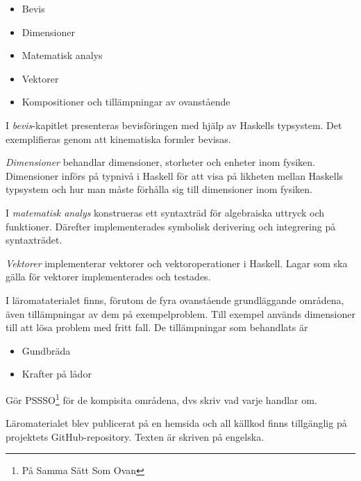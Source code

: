 \begin{draft}
\begin{itemize}
  \item Bevis
  \item Dimensioner
  \item Matematisk analys
  \item Vektorer
  \item Kompositioner och tillämpningar av ovanstående
\end{itemize}

I \textit{bevis}-kapitlet presenteras bevisföringen med hjälp av Haskells
typsystem. Det exemplifieras genom att kinematiska formler bevisas.

\textit{Dimensioner} behandlar dimensioner, storheter och enheter inom fysiken.
Dimensioner införs på typnivå i Haskell för att visa på likheten mellan
Haskells typsystem och hur man måste förhålla sig till dimensioner inom
fysiken.

I \textit{matematisk analys} konstrueras ett syntaxträd för algebraiska uttryck
och funktioner. Därefter implementerades symbolisk derivering och integrering på
syntaxträdet.

\textit{Vektorer} implementerar vektorer och vektoroperationer i Haskell. Lagar
som ska gälla för vektorer implementerades och testades.

I läromataterialet finns, förutom de fyra ovanstående grundläggande områdena,
även tillämpningar av dem på exempelproblem. Till exempel används dimensioner
till att lösa problem med fritt fall. De tillämpningar som behandlats är

\begin{itemize}
  \item Gundbräda
  \item Krafter på lådor
\end{itemize}

Gör PSSSO\footnote{På Samma Sätt Som Ovan} för de kompisita områdena, dvs skriv vad varje handlar om.

Läromaterialet blev publicerat på en hemsida\cite{LYAP} och all källkod finns
tillgänglig på projektets GitHub-repository.\cite{LYAP_repo} Texten är skriven
på engelska.

\end{draft}

